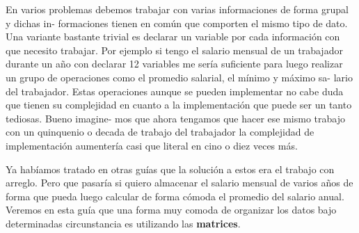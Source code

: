 En varios problemas debemos trabajar con varias informaciones de forma grupal y dichas in-
formaciones tienen en común que comporten el mismo tipo de dato. Una variante bastante trivial
es declarar un variable por cada información con que necesito trabajar. Por ejemplo si tengo el
salario mensual de un trabajador durante un año con declarar 12 variables me sería suficiente
para luego realizar un grupo de operaciones como el promedio salarial, el mínimo y máximo sa-
lario del trabajador. Estas operaciones aunque se pueden implementar no cabe duda que tienen
su complejidad en cuanto a la implementación que puede ser un tanto tediosas. Bueno imagine-
mos que ahora tengamos que hacer ese mismo trabajo con un quinquenio o decada de trabajo del
trabajador la complejidad de implementación aumentería casi que literal en cino o diez veces más.

Ya habíamos tratado en otras guías que la solución a estos era el trabajo con arreglo. Pero que pasaría si quiero almacenar el salario mensual de varios años de forma que pueda luego calcular de forma cómoda el promedio del salario anual. Veremos en esta guía que una forma muy comoda de organizar los datos bajo determinadas circunstancia es utilizando las \textbf{matrices}.   